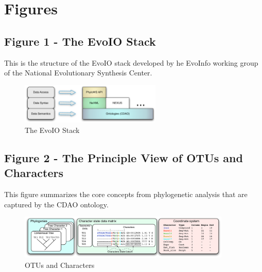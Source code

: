 \documentclass[10pt]{bmc_article}
\newenvironment{bmcformat}{\fussy\setboolean{publ}{true}}{\fussy}
\begin{document}
\begin{bmcformat}
{
   }     %





\section*{Figures}

\subsection*{Figure 1 - The EvoIO Stack}
This is the structure of the EvoIO stack developed by he EvoInfo working
group of the National Evolutionary Synthesis Center.

\begin{figure}[h]
\centerline{\includegraphics[width=0.6\textwidth]{EvoioStack.pdf}}
\caption{The EvoIO Stack}
\label{stack}
\end{figure}

\newpage

\subsection*{Figure 2 - The Principle View of OTUs and Characters}
This figure summarizes the core concepts from phylogenetic analysis that
are captured by the CDAO ontology.

\begin{figure}[h]
\centerline{\includegraphics[width=0.9\textwidth]{cdofig.pdf}}
\caption{OTUs and Characters}
\label{cdao1}
\end{figure}


\end{bmcformat}
\end{document}
